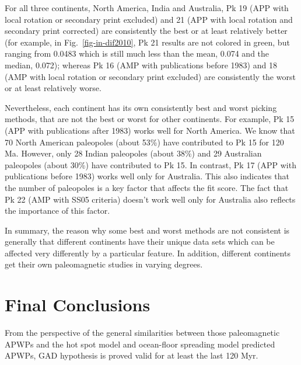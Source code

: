 For all three continents, North America, India and Australia, Pk 19 (APP with
local rotation or secondary print excluded) and 21 (APP with local rotation and
secondary print corrected) are consistently the best or at least relatively
better (for example, in Fig.~\ref{fig-in-dif2010}, Pk 21 results are not colored
in green, but ranging from 0.0483 which is still much less than
the mean, 0.074 and the median, 0.072); whereas Pk 16 (AMP with publications
before 1983) and 18 (AMP with local rotation or secondary print excluded) are
consistently the worst or at least relatively worse.

Nevertheless, each continent has its own consistently best and worst picking
methods, that are not the best or worst for other continents. For example, Pk 15
(APP with publications after 1983) works well for North America. We know that 70
North American paleopoles (about 53\%) have contributed to Pk 15 for
120 Ma. However, only 28 Indian paleopoles (about 38\%) and 29
Australian paleopoles (about 30\%) have contributed to Pk 15. In contrast, Pk 17
(APP with publications before 1983) works well only for Australia. This also
indicates that the number of paleopoles is a key factor that affects the fit
score. The fact that Pk 22 (AMP with SS05 criteria) doesn't work well only for
Australia also reflects the importance of this factor.

In summary, the reason why some best and worst methods are not consistent is
generally that different continents have their unique data sets which can be
affected very differently by a particular feature. In addition, different
continents get their own paleomagnetic studies in varying degrees.


\section{Final Conclusions}

From the perspective of the general similarities between those paleomagnetic
APWPs and the hot spot model and ocean-floor spreading model predicted APWPs,
GAD hypothesis is proved valid for at least the last 120 Myr.

